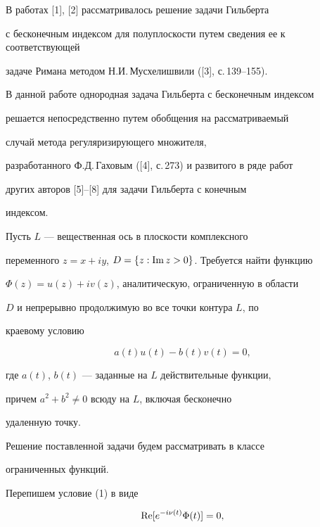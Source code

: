 \label{begin}





В работах [1], [2] рассматривалось решение задачи Гильберта


с бесконечным индексом для полуплоскости путем сведения ее к соответствующей


задаче Римана методом Н.И.\,Мусхелишвили ([3], с.\,139--155).





В данной работе однородная задача Гильберта с бесконечным индексом


решается непосредственно путем обобщения на рассматриваемый


случай метода регуляризирующего множителя,


разработанного Ф.Д.\,Гаховым ([4], с.\,273) и развитого в ряде работ


других авторов [5]--[8] для задачи Гильберта с конечным


индексом.





Пусть $L$ --- вещественная ось в плоскости комплексного


переменного $z=x+iy$, $D=\{z:\operatorname{Im} z > 0\}$. Требуется найти функцию


$\Phi (z) = u(z)+iv(z)$, аналитическую, ограниченную в области


$D$ и непрерывно продолжимую во все точки контура $L$, по


краевому условию


\begin{equation}


a(t)u(t) - b(t)v(t) = 0,


\end{equation}


где $a(t)$, $b(t)$ --- заданные на $L$ действительные функции,


причем $a^2 + b^2 \neq 0$ всюду на $L$, включая бесконечно


удаленную точку.





Решение поставленной задачи будем рассматривать в классе


ограниченных функций.





Перепишем условие (1) в виде


\begin{equation}


\re[e^{-i\nu (t)}\Phi (t)]=0,


\end{equation}


